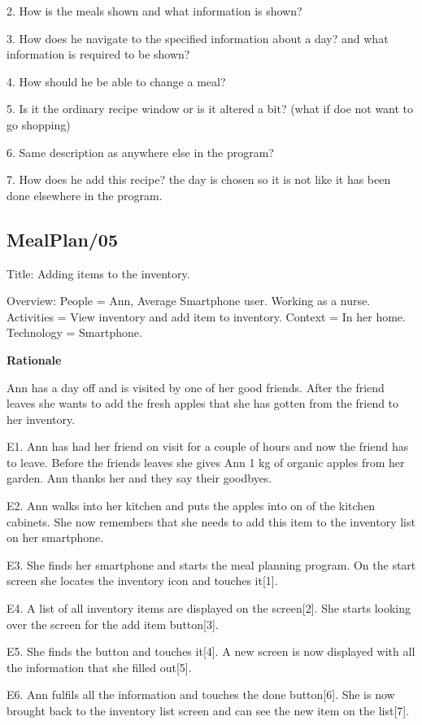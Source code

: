 2. How is the meals shown and what information is shown? 

3. How does he navigate to the specified information about a day? and what information is required to be shown?

4. How should he be able to change a meal?

5. Is it the ordinary recipe window or is it altered a bit? (what if doe not want to go shopping) 

6. Same description as anywhere else in the program?

7. How does he add this recipe? the day is chosen so it is not like it has been done elsewhere in the program.

\subsection{MealPlan/05} \label{MealPlan05}

Title: Adding items to the inventory.

Overview:
	People = Ann, Average Smartphone user. Working as a nurse.
	Activities = View inventory and add item to inventory.
	Context = In her home.
	Technology = Smartphone.

\textbf{Rationale}

Ann has a day off and is visited by one of her good friends. After the friend leaves she wants to add the fresh apples that she has gotten from the friend to her inventory.

	E1. Ann has had her friend on visit for a couple of hours and now the friend has to leave. Before the friends leaves she gives Ann 1 kg of organic apples from her garden. Ann thanks her and they say their goodbyes.

	E2. Ann walks into her kitchen and puts the apples into on of the kitchen cabinets. She now remembers that she needs to add this item to the inventory list on her smartphone.

	E3. She finds her smartphone and starts the meal planning program. On the start screen she locates the inventory icon and touches it[1].

	E4. A list of all inventory items are displayed on the screen[2]. She starts looking over the screen for the add item button[3].

	E5. She finds the button and touches it[4]. A new screen is now displayed with all the information that she filled out[5]. 

	E6. Ann fulfils all the information and touches the done button[6]. She is now brought back to the inventory list screen and can see the new item on the list[7].

